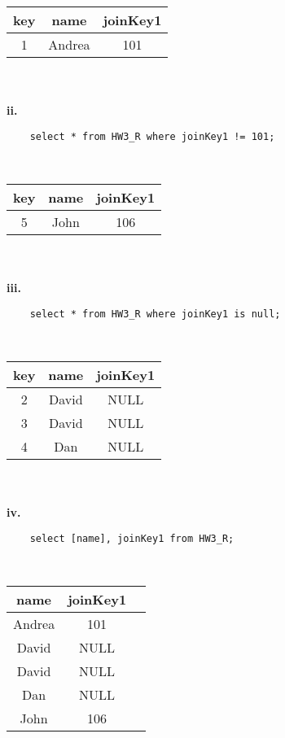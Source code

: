 \documentclass[12pt, letterpaper, fleqn]{article}
\begin{document}
  \begin{tabular}{ c c c }
    key & name & joinKey1 \\
    \hline 
    1	& Andrea	& 101
  \end{tabular} \\\\

  \textbf{ii.}\\
  \begin{verbatim}
    select * from HW3_R where joinKey1 != 101;
  \end{verbatim}\\

  \begin{tabular}{ c c c }
    key & name & joinKey1 \\
    \hline 
    5	& John	& 106
  \end{tabular} \\\\

  \textbf{iii.}\\
  \begin{verbatim}
    select * from HW3_R where joinKey1 is null;
  \end{verbatim}\\

  \begin{tabular}{ c c c }
    key & name & joinKey1 \\
    \hline 
    2 &	David &	NULL \\
    3	& David	& NULL \\
    4	& Dan	& NULL
  \end{tabular} \\\\

  \textbf{iv.}\\
  \begin{verbatim}
    select [name], joinKey1 from HW3_R;
  \end{verbatim}\\

  \begin{tabular}{ c c c }
    name & joinKey1 \\
    \hline 
    Andrea & 	101 \\
    David	& NULL \\
    David	& NULL \\
    Dan	& NULL \\
    John	& 106
  \end{tabular} \\\\
\end{document}
